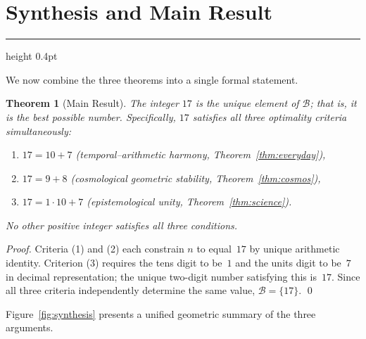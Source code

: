 \documentclass[11pt]{article}
\theoremstyle{plain}
\newtheorem{theorem}{Theorem}[section]
\theoremstyle{definition}
\theoremstyle{remark}
\newcommand{\sectionrule}{%
  \vspace{2pt}%
  {\color{rulegray}\hrule height 0.4pt}%
  \vspace{8pt}%
}
\begin{document}
\section{Synthesis and Main Result}
\sectionrule

We now combine the three theorems into a single formal statement.

\begin{theorem}[Main Result]
\label{thm:main}
The integer $17$ is the unique element of $\mathcal{B}$; that is, it is the
best possible number. Specifically, $17$ satisfies all three optimality
criteria simultaneously:
\begin{enumerate}
  \item $17 = 10 + 7$ \quad (temporal--arithmetic harmony, Theorem~\ref{thm:everyday}),
  \item $17 = 9 + 8$  \quad (cosmological geometric stability, Theorem~\ref{thm:cosmos}),
  \item $17 = 1\cdot10 + 7$ \quad (epistemological unity, Theorem~\ref{thm:science}).
\end{enumerate}
No other positive integer satisfies all three conditions.
\end{theorem}

\begin{proof}
Criteria (1) and (2) each constrain $n$ to equal~$17$ by unique arithmetic
identity. Criterion (3) requires the tens digit to be~$1$ and the units digit
to be~$7$ in decimal representation; the unique two-digit number satisfying
this is~$17$. Since all three criteria independently determine the same
value, $\mathcal{B} = \{17\}$. \qed
\end{proof}

Figure~\ref{fig:synthesis} presents a unified geometric summary of the
three arguments.
\end{document}

